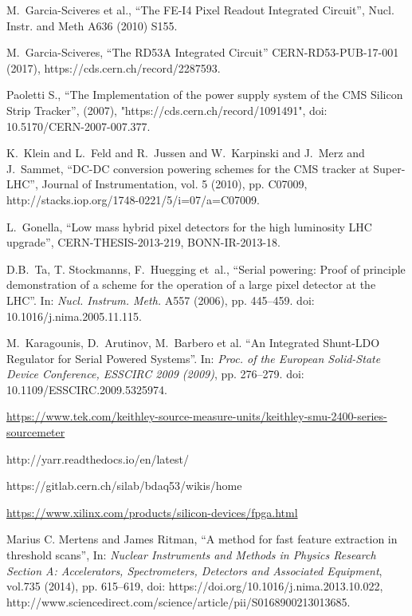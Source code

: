 \begin{thebibliography}{1}
 M.~Garcia-Sciveres et al., ``The FE-I4 Pixel Readout
  Integrated Circuit'', Nucl. Instr. and Meth A636 (2010) S155.

 M.~Garcia-Sciveres, ``The RD53A Integrated Circuit''
  CERN-RD53-PUB-17-001 (2017), https://cds.cern.ch/record/2287593.

 Paoletti S., ``The Implementation of the power supply system of the CMS Silicon Strip Tracker'', (2007), "https://cds.cern.ch/record/1091491", doi: 10.5170/CERN-2007-007.377.

% 
K.~Klein and L.~Feld and R.~Jussen and W.~Karpinski and J.~Merz and J.~Sammet, ``DC-DC conversion powering schemes for the CMS tracker at Super-LHC'', Journal of Instrumentation, vol. 5 (2010), pp. C07009, http://stacks.iop.org/1748-0221/5/i=07/a=C07009.

 L.~Gonella, ``Low mass hybrid pixel detectors for the high luminosity LHC upgrade'', CERN-THESIS-2013-219, BONN-IR-2013-18.
  
 D.B.~Ta, T. Stockmanns, F.~Huegging et~al., ``Serial powering: Proof of principle demonstration of a scheme for the operation of a large pixel detector at the LHC''. In: \textit{Nucl. Instrum. Meth.} A557 (2006), pp. 445--459. doi: 10.1016/j.nima.2005.11.115.

 M.~Karagounis, D.~Arutinov, M.~Barbero et al. ``An Integrated Shunt-LDO Regulator for Serial Powered Systems''. In: \textit{Proc. of the European Solid-State Device Conference,
ESSCIRC 2009 (2009)}, pp. 276–279. doi: 10.1109/ESSCIRC.2009.5325974.

 \url{https://www.tek.com/keithley-source-measure-units/keithley-smu-2400-series-sourcemeter}

 http://yarr.readthedocs.io/en/latest/

 https://gitlab.cern.ch/silab/bdaq53/wikis/home

 \url{https://www.xilinx.com/products/silicon-devices/fpga.html}

 Marius C. Mertens and James Ritman, ``A method for fast feature extraction in threshold scans'', 
In: \textit{Nuclear Instruments and Methods in Physics Research Section A: Accelerators, Spectrometers, Detectors and Associated Equipment}, 
vol.735 (2014), pp. 615--619, doi: https://doi.org/10.1016/j.nima.2013.10.022, 
http://www.sciencedirect.com/science/article/pii/S0168900213013685.


\end{thebibliography}
